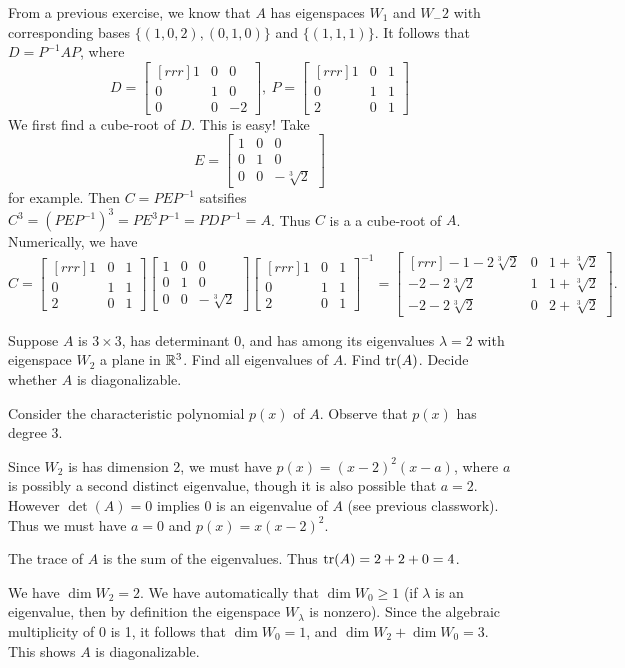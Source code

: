 \begin{solution}
From a previous exercise, we know that $A$ has eigenspaces $W_1$ and $W_-2$ with corresponding bases $\{(1,0,2),(0,1,0)\}$ and $\{(1,1,1)\}$. It follows that $D=P^{-1}AP$, where 
\[
D=\begin{bmatrix}[rrr]
1&0&0\\
0&1&0\\
0&0&-2
\end{bmatrix}, \ P=\begin{bmatrix}[rrr]
1&0&1\\
0&1&1\\
2&0&1
\end{bmatrix}
\] 
We first find a cube-root of $D$. This is easy! Take \[
E=\begin{bmatrix}
1&0&0\\
0&1&0\\
0&0&-\sqrt[3]{2}
\end{bmatrix}
\]
for example. Then $C=PEP^{-1}$ satsifies $C^3=(PEP^{-1})^3=PE^3P^{-1}=PDP^{-1}=A$. Thus $C$ is a a cube-root of $A$. Numerically, we have 
\[
C=\begin{bmatrix}[rrr]
1&0&1\\
0&1&1\\
2&0&1
\end{bmatrix}
\begin{bmatrix}
1&0&0\\
0&1&0\\
0&0&-\sqrt[3]{2}
\end{bmatrix}
\begin{bmatrix}[rrr]
1&0&1\\
0&1&1\\
2&0&1
\end{bmatrix}^{-1}=\begin{bmatrix}[rrr]
-1-2\sqrt[3]{2}&0&1+\sqrt[3]{2}\\
-2-2\sqrt[3]{2}&1&1+\sqrt[3]{2}\\
-2-2\sqrt[3]{2}&0&2+\sqrt[3]{2}
\end{bmatrix}.
\]
\end{solution}
\ii Suppose $A$ is $3\times 3$, has determinant 0, and has among its eigenvalues $\lambda=2$ with eigenspace $W_2$ a plane in ${\mathbb R}^3$. 
\bb
\ii Find all eigenvalues of $A$.
\ii Find $\operatorname{tr}(A)$. 
\ii Decide whether $A$ is diagonalizable. 
\ee
\begin{solution}
Consider the characteristic polynomial $p(x)$ of $A$. Observe that $p(x)$ has degree 3. 

Since $W_2$ is has dimension 2, we must have $p(x)=(x-2)^2(x-a)$, where $a$ is possibly a second distinct eigenvalue, though it is also possible that $a=2$. However $\det(A)=0$ implies 0 is an eigenvalue of $A$ (see previous classwork). Thus we must have $a=0$ and $p(x)=x(x-2)^2$. 

The trace of $A$ is the sum of the eigenvalues. Thus $\operatorname{tr}(A)=2+2+0=4$. 

We have $\dim W_2=2$. We have automatically that $\dim W_0\geq 1$ (if $\lambda$ is an eigenvalue, then by definition the eigenspace $W_\lambda$ is nonzero). Since the algebraic multiplicity of $0$ is 1, it follows that $\dim W_0=1$, and $\dim W_2+\dim W_0=3$. This shows $A$ is diagonalizable.  
\end{solution}

